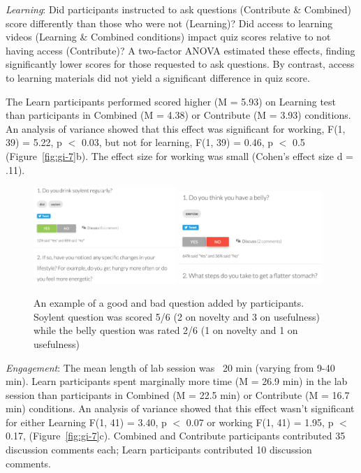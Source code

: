 \textit{Learning}: Did participants instructed to ask questions (Contribute \& Combined) score differently than those who were not (Learning)? Did access to learning videos (Learning \& Combined conditions) impact quiz scores relative to not having access (Contribute)? A two-factor ANOVA estimated these effects, finding significantly lower scores for those requested to ask questions. By contrast, access to learning materials did not yield a significant difference in quiz score.

The Learn participants performed scored higher (M = 5.93) on Learning test than participants in Combined (M = 4.38) or Contribute (M = 3.93) conditions. An analysis of variance showed that this effect was significant for working, F(1, 39) = 5.22, p $<$ 0.03, but not for learning, F(1, 39) = 0.46, p $<$ 0.5 (Figure~\ref{fig:gi-7}b). The effect size for working was small (Cohen’s effect size d = .11).

\begin{figure}[h] 
  \centering
  \includegraphics[width=0.48\textwidth]{figures/gutinstinct/gi-8a.png}
  \includegraphics[width=0.48\textwidth]{figures/gutinstinct/gi-8b.png}
  \caption[Examples of questions added by participants]
{An example of a good and bad question added by participants. Soylent question was scored 5/6 (2 on novelty and 3 on usefulness) while the belly question was rated 2/6 (1 on novelty and 1 on usefulness) }
  \label{fig:gi-8}
\end{figure}

\textit{Engagement}: The mean length of lab session was ~20 min (varying from 9-40 min). Learn participants spent marginally more time (M = 26.9 min) in the lab session than participants in Combined (M = 22.5 min) or Contribute (M = 16.7 min) conditions. An analysis of variance showed that this effect wasn’t significant for either Learning F(1, 41) = 3.40, p $<$ 0.07 or working F(1, 41) = 1.95, p $<$ 0.17, (Figure~\ref{fig:gi-7}c). Combined and Contribute participants contributed 35 discussion comments each; Learn participants contributed 10 discussion comments.

